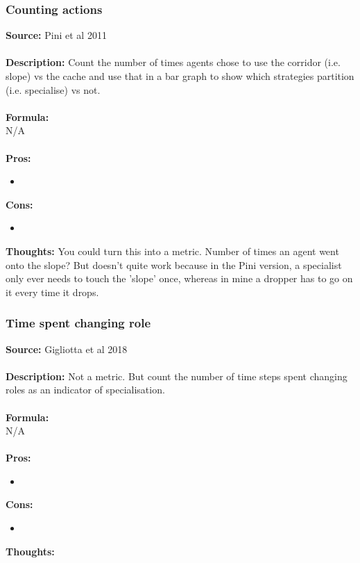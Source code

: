 \documentclass[12pt]{article}
\begin{document}
\subsubsection{Counting actions}

\textbf{Source: } Pini et al 2011 \cite{pini:SI:2011}\\\\
\textbf{Description: } Count the number of times agents chose to use the corridor (i.e. slope) vs the cache and use that in a bar graph to show which strategies partition (i.e. specialise) vs not. \\\\
\textbf{Formula: }\\
N/A
\\\\
\textbf{Pros:}
\begin{itemize}
\item 
\end{itemize}
\textbf{Cons:}
\begin{itemize}
\item 
\end{itemize}
\textbf{Thoughts:} You could turn this into a metric. Number of times an agent went onto the slope? But doesn't quite work because in the Pini version, a specialist only ever needs to touch the 'slope' once, whereas in mine a dropper has to go on it every time it drops. \\

\subsubsection{Time spent changing role}

\textbf{Source: } Gigliotta et al 2018 \cite{gigliotta:Neurocomputing:2018} \\\\
\textbf{Description: } Not a metric. But count the number of time steps spent changing roles as an indicator of specialisation.\\\\
\textbf{Formula: }\\
N/A
\\\\
\textbf{Pros:}
\begin{itemize}
\item 
\end{itemize}
\textbf{Cons:}
\begin{itemize}
\item 
\end{itemize}
\textbf{Thoughts:}\\
\end{document}
